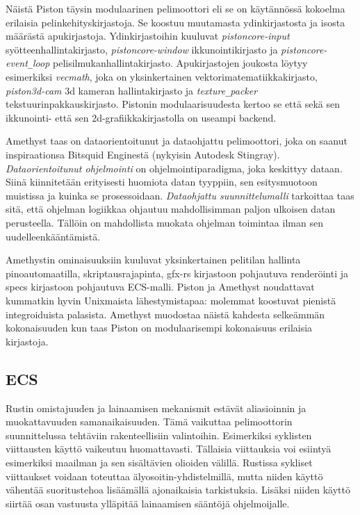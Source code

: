 \documentclass[finnish]{tktltiki2}
\theoremstyle{definition}
\theoremstyle{remark}
\begin{document}
Näistä Piston täysin modulaarinen pelimoottori eli se on käytännössä kokoelma erilaisia pelinkehityskirjastoja. Se koostuu muutamasta ydinkirjastosta ja isosta määrästä apukirjastoja. Ydinkirjastoihin kuuluvat \textit{pistoncore-input} syötteenhallintakirjasto, \textit{pistoncore-window} ikkunointikirjasto ja \textit{pistoncore-event\texttt{\_}loop} pelisilmukanhallintakirjasto. Apukirjastojen joukosta löytyy esimerkiksi \textit{vecmath}, joka on yksinkertainen vektorimatematiikkakirjasto, \textit{piston3d-cam} 3d kameran hallintakirjasto ja \textit{texture\texttt{\_}packer} tekstuurinpakkauskirjasto. Pistonin modulaarisuudesta kertoo se että sekä sen ikkunointi- että sen 2d-grafiikkakirjastolla on useampi backend.  

Amethyst\cite{Amethyst} taas on dataorientoitunut ja dataohjattu pelimoottori, joka on saanut inspiraationsa Bitsquid Enginestä (nykyisin Autodesk Stingray)\cite{AmethystReadme}. \textit{Dataorientoitunut ohjelmointi} on ohjelmointiparadigma, joka keskittyy dataan. Siinä kiinnitetään erityisesti huomiota datan tyyppiin, sen esitysmuotoon muistissa ja kuinka se prosessoidaan. \textit{Dataohjattu suunnittelumalli} tarkoittaa taas sitä, että ohjelman logiikkaa ohjautuu mahdollisimman paljon ulkoisen datan perusteella. Tällöin on mahdollista muokata ohjelman toimintaa ilman sen uudelleenkääntämistä. \cite{AmethystGlossary}

Amethystin ominaisuuksiin kuuluvat yksinkertainen pelitilan hallinta pinoautomaatilla, skriptausrajapinta, gfx-rs kirjastoon pohjautuva renderöinti ja specs kirjastoon pohjautuva ECS-malli. Piston ja Amethyst noudattavat kummatkin hyvin Unixmaista lähestymistapaa: molemmat koostuvat pienistä integroiduista palasista. Amethyst muodostaa näistä kahdesta selkeämmän kokonaisuuden kun taas Piston on modulaarisempi kokonaisuus erilaisia kirjastoja.

\subsection{ECS}
Rustin omistajuuden ja lainaamisen mekanismit estävät aliasioinnin ja muokattavuuden samanaikaisuuden. Tämä vaikuttaa pelimoottorin suunnittelussa tehtäviin rakenteellisiin valintoihin. Esimerkiksi syklisten viittausten käyttö vaikeutuu huomattavasti. Tällaisia viittauksia voi esiintyä esimerkiksi maailman ja sen sisältävien olioiden välillä. Rustissa sykliset viittaukset voidaan toteuttaa älyosoitin-yhdistelmillä, mutta niiden käyttö vähentää suoritustehoa lisäämällä ajonaikaisia tarkistuksia. Lisäksi niiden käyttö siirtää osan vastuusta ylläpitää lainaamisen sääntöjä ohjelmoijalle.
\end{document}
